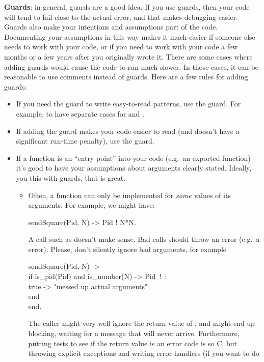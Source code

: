 \documentclass{article}
\begin{document}
\textbf{Guards}: in general, guards are a good idea.
If you use guards, then your code will tend to fail close to the actual error, and
that makes debugging easier.
Guards also make your intentions and assumptions part of the code.
Documenting your assumptions in this way makes it much easier if someone else needs
to work with your code, or if you need to work with your code a few months or a few
years after you originally wrote it.
There are some cases where adding guards would cause the code to run much slower.
In those cases, it can be reasonable to use comments instead of guards.
Here are a few rules for adding guards:
\begin{itemize}
  \item If you need the guard to write easy-to-read patterns, use the guard.
    For example, to have separate cases for  and .
  \item If adding the guard makes your code easier to read (and doesn't have a
    significant run-time penalty), use the guard.
  \item If a function is an ``entry point'' into your code (e.g.\ an exported function)
    it's good to have your assumptions about arguments clearly stated.  Ideally, you
    this with guards, that is great.  
    \begin{itemize}
      \item Often, a function can only be implemented for \emph{some} values of its arguments.
	For example, we might have:
	\begin{SmallCode}
	  sendSquare(Pid, N) -> Pid ! N*N.
	\end{SmallCode}
	A call such as  doesn't make sense.
	Bad calls should throw an error (e.g.\ a  error).
	Please, don't silently ignore bad arguments, for example
	\begin{SmallCode}
	  sendSquare(Pid, N) ->\\
	  \> if \=is\_pid(Pid) and is\_number(N) -> Pid~!~;\\
	  \>    \>true -> "messed up actual arguments" \xcomment{\textcolor{red}{Don't do this.}}\\
	  \> end\\
	  end.
	\end{SmallCode}
	The caller might very well ignore the return value of , and
	 might end up blocking, waiting for a message that will never arrive.
	Furthermore, putting tests to see if the return value is an error code is so C,
	but throwing explicit exceptions and writing error handlers (if you want to do

\end{itemize}
\end{itemize}
\end{document}
